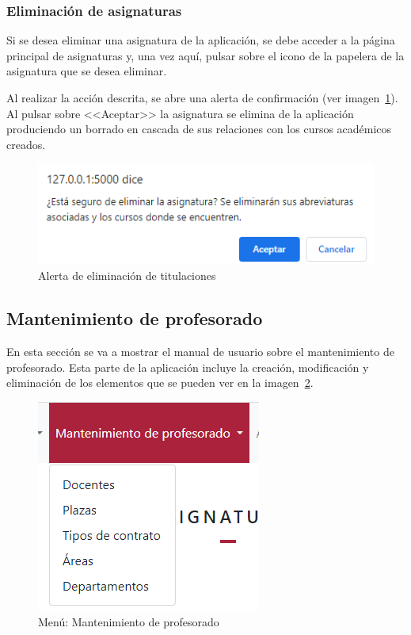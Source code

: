 \subsubsection{Eliminación de asignaturas}
Si se desea eliminar una asignatura de la aplicación, se debe acceder a la página principal de asignaturas y, una vez aquí, pulsar sobre el icono de la papelera de la asignatura que se desea eliminar.

Al realizar la acción descrita, se abre una alerta de confirmación (ver imagen~\ref{pag:alertElAsignatura}).
Al pulsar sobre <<Aceptar>> la asignatura se elimina de la aplicación produciendo un borrado en cascada de sus relaciones con los cursos académicos creados.

\begin{figure}
	\centering
	\includegraphics[width=.65\textwidth]{../img/Anexos/Manual usuario/alertElAsignatura.png}
	\caption{Alerta de eliminación de titulaciones}\label{pag:alertElAsignatura}
\end{figure}

\subsection{Mantenimiento de profesorado}
En esta sección se va a mostrar el manual de usuario sobre el mantenimiento de profesorado.
Esta parte de la aplicación incluye la creación, modificación y eliminación de los elementos que se pueden ver en la imagen~\ref{pag:menuManProf}.

\begin{figure}
	\centering
	\includegraphics[width=.45\textwidth]{../img/Anexos/Manual usuario/menu man prof.png}
	\caption{Menú: Mantenimiento de profesorado}\label{pag:menuManProf}
\end{figure}

